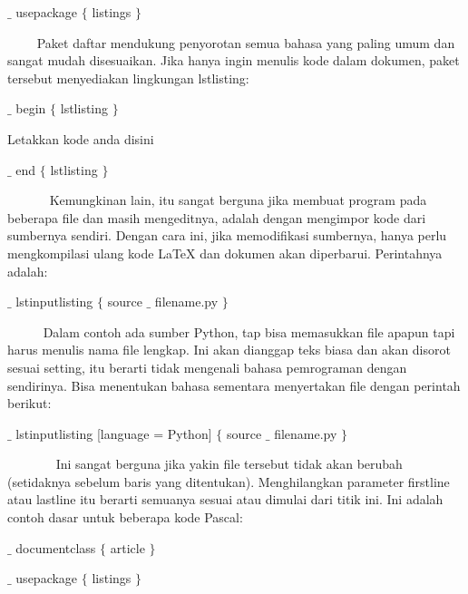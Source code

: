 $ \_ $  usepackage  $ \{ $ listings $ \} $

\vspace{12pt}
~~~~ Paket daftar mendukung penyorotan semua bahasa yang paling umum dan sangat mudah disesuaikan. Jika hanya ingin menulis kode dalam dokumen, paket tersebut menyediakan lingkungan lstlisting: \par
$ \_ $  begin  $ \{ $ lstlisting $ \} $ \par

Letakkan kode anda disini  \par 
 
$ \_ $ end  $ \{ $ lstlisting $ \} $ \par
 
\vspace{12pt}
~~~~~~ Kemungkinan lain, itu sangat berguna jika membuat program pada beberapa file dan masih mengeditnya, adalah dengan mengimpor kode dari sumbernya sendiri. Dengan cara ini, jika memodifikasi sumbernya,  hanya perlu mengkompilasi ulang kode LaTeX dan dokumen akan diperbarui. Perintahnya adalah: \par
$ \_ $  lstinputlisting  $ \{ $ source $ \_ $ filename.py $ \} $ \par

\vspace{12pt}
~~~~~ Dalam contoh ada sumber Python, tap bisa memasukkan file apapun tapi harus menulis nama file lengkap. Ini akan dianggap teks biasa dan akan disorot sesuai setting, itu berarti tidak mengenali bahasa pemrograman dengan sendirinya. Bisa menentukan bahasa sementara menyertakan file dengan perintah berikut: \par

 $ \_ $  lstinputlisting [language = Python]  $ \{ $ source $ \_ $ filename.py $ \} $ \par

\vspace{12pt}
\noindent ~~~~~~~ Ini sangat berguna jika yakin file tersebut tidak akan berubah (setidaknya sebelum baris yang ditentukan). Menghilangkan parameter firstline atau lastline itu berarti semuanya sesuai atau dimulai dari titik ini. Ini adalah contoh dasar untuk beberapa kode Pascal:\par


\noindent  $ \_ $ documentclass $ \{ $ article $ \} $ \par


\noindent  $ \_ $ usepackage $ \{ $ listings $ \} $ ~~~~~~~~~~~~ \par


